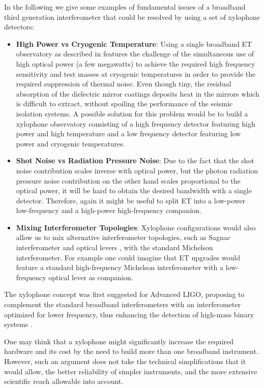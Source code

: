 In the following we give some examples of fundamental issues of a broadband third generation interferometer that could be resolved by using a set of xylophone detectors:
\begin{itemize}
\item \textbf{High Power vs Cryogenic Temperature}: Using a single broadband ET observatory as described in \cite{HildETconventional} features the challenge of the simultaneous use of high optical power (a few megawatts) to achieve the required high frequency sensitivity and test masses at cryogenic temperatures in order to provide the required suppression of thermal noise. Even though tiny, the residual absorption of the dielectric mirror coatings deposits heat in the mirrors which is difficult to extract, without spoiling the performance of the seismic isolation systems. A possible solution for this problem would be to build a xylophone observatory consisting of a high frequency detector featuring high power and high temperature and a low frequency detector featuring low power and cryogenic temperatures.
\item \textbf{Shot Noise vs Radiation Pressure Noise}: Due to the fact that the shot noise contribution scales inverse with optical power, but the photon radiation pressure noise contribution on the other hand  scales proportional to the optical power, it will be hard to obtain the desired bandwidth with a single detector. Therefore, again it might be useful to split ET into a low-power low-frequency and a high-power high-frequency
companion.
\item \textbf{Mixing Interferometer Topologies}: Xylophone configurations would also allow us to mix alternative interferometer topologies, such as Sagnac interferometer \cite{Chen2003} and optical levers \cite{Khalili2002}, with the standard Michelson interferometer. For example one could imagine that ET upgrades would feature a standard high-frequency Michelson interferometer with a low-frequency optical lever as companion.
\end{itemize}

The xylophone concept was first suggested for Advanced LIGO,  proposing to complement the standard broadband interferometers with an interferometer optimized for lower frequency, thus enhancing the detection of high-mass binary systems
\cite{Shoemaker2001LIGOXylophone, Conforto2004}.

One may think that a xylophone might significantly increase the required hardware and its cost by the need to build more than one broadband instrument. However, such an argument does not take the technical simplifications that it would allow, the better reliability of simpler instruments, and the more extensive scientific reach allowable into account.

